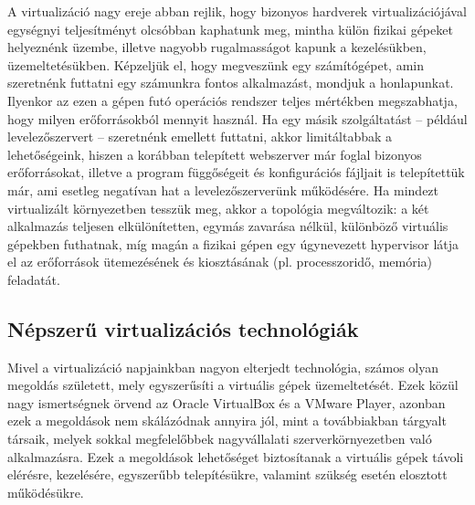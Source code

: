 A virtualizáció nagy ereje abban rejlik, hogy bizonyos hardverek virtualizációjával egységnyi teljesítményt olcsóbban kaphatunk meg, mintha külön fizikai gépeket helyeznénk üzembe, illetve nagyobb rugalmasságot kapunk a kezelésükben, üzemeltetésükben. Képzeljük el, hogy megveszünk egy számítógépet, amin szeretnénk futtatni egy számunkra fontos alkalmazást, mondjuk a honlapunkat. Ilyenkor az ezen a gépen futó operációs rendszer teljes mértékben megszabhatja, hogy milyen erőforrásokból mennyit használ. Ha egy másik szolgáltatást -- például levelezőszervert -- szeretnénk emellett futtatni, akkor limitáltabbak a lehetőségeink, hiszen a korábban telepített webszerver már foglal bizonyos erőforrásokat, illetve a program függőségeit és konfigurációs fájljait is telepítettük már, ami esetleg negatívan hat a levelezőszerverünk működésére. Ha mindezt virtualizált környezetben tesszük meg, akkor a topológia megváltozik: a két alkalmazás teljesen elkülönítetten, egymás zavarása nélkül, különböző virtuális gépekben futhatnak, míg magán a fizikai gépen egy úgynevezett hypervisor látja el az erőforrások ütemezésének és kiosztásának (pl. processzoridő, memória) feladatát.

\subsection{Népszerű virtualizációs technológiák}
Mivel a virtualizáció napjainkban nagyon elterjedt technológia, számos olyan megoldás született, mely egyszerűsíti a virtuális gépek üzemeltetését. Ezek közül nagy ismertségnek örvend az Oracle VirtualBox és a VMware Player, azonban ezek a megoldások nem skálázódnak annyira jól, mint a továbbiakban tárgyalt társaik, melyek sokkal megfelelőbbek nagyvállalati szerverkörnyezetben való alkalmazásra. Ezek a megoldások lehetőséget biztosítanak a virtuális gépek távoli elérésre, kezelésére, egyszerűbb telepítésükre, valamint szükség esetén elosztott működésükre.

